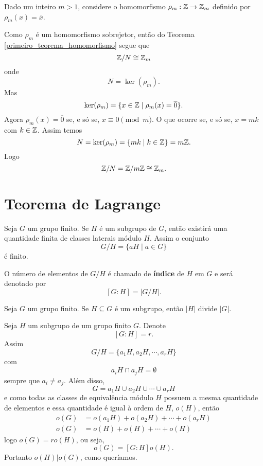 \begin{exemplo}
    Dado um inteiro $m > 1$, considere o homomorfismo $\rho_m : \mathbb{Z} \to \mathbb{Z}_m$ definido por $\rho_m(x) = \overline{x}$.
\end{exemplo}
\begin{solucao}
    Como $\rho_m$ é um homomorfismo sobrejetor, então do Teorema \ref{primeiro_teorema_homomorfismo} segue que
    \[
        \mathbb{Z}/N \cong \mathbb{Z}_m
    \]
    onde
    \[
        N = \ker(\rho_m).
    \]
    Mas
    \[
        \ker(\rho_m) = \{x \in \mathbb{Z} \mid \rho_m(x) = \overline{0}\}.
    \]
    Agora $\rho_m(x) = \overline{0}$ se, e só se, $x \equiv 0 \pmod m$. O que ocorre se, e só se, $x = mk$ com $k \in \mathbb{Z}$. Assim temos
    \[
        N = \ker(\rho_m) = \{mk \mid k \in \mathbb{Z}\} = m\mathbb{Z}.
    \]
    Logo
    \[
        \mathbb{Z}/N = \mathbb{Z}/m\mathbb{Z} \cong \mathbb{Z}_m.
    \]
\end{solucao}

\section{Teorema de Lagrange}

Seja $G$ um grupo finito. Se $H$ é um subgrupo de $G$, então existirá uma quantidade finita de classes laterais módulo $H$.
Assim o conjunto
\[
    G/H = \{aH \mid a \in G\}
\]
é finito.

O número de elementos de $G/H$ é chamado de \textbf{índice} de $H$ em $G$ e será denotado por
\[
    [G : H] = |G/H|.
\]

\begin{teorema}\label{teorema_de_lagrange}
    Seja $G$ um grupo finito. Se $H\subseteq G$ é um subgrupo, então $|H|$ divide $|G|$.
\end{teorema}
\begin{prova}
    Seja $H$ um subgrupo de um grupo finito $G$. Denote
    \[
        [G : H] = r.
    \]
    Assim
    \[
        G/H = \{a_1H, a_2H, \cdots, a_rH\}
    \]
    com
    \[
        a_iH \cap a_jH = \emptyset
    \]
    sempre que $a_i \ne a_j$. Além disso,
    \[
        G = a_1H \cup a_2H \cup \cdots \cup a_rH
    \]
    e como todas as classes de equivalência módulo $H$ possuem a mesma quantidade de elementos e essa quantidade é igual à ordem de $H$, $o(H)$, então
    \begin{align*}
        o(G) &= o(a_1H) + o(a_2H) + \cdots + o(a_rH)\\
        o(G) &= o(H) + o(H) + \cdots + o(H)
    \end{align*}
    logo $o(G) = ro(H)$, ou seja,
    \[
        o(G) = [G : H]o(H).
    \]
    Portanto $o(H) | o(G)$, como queríamos.
\end{prova}

